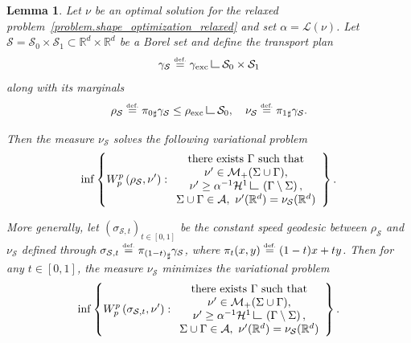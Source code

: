 \documentclass[10pt]{amsart}
\newtheorem{lemma}[theorem]{Lemma}
\theoremstyle{definition}
\newcommand{\eqdef}{\ensuremath{\stackrel{\mbox{\upshape\tiny def.}}{=}}}
\newcommand\LM[1]{\hbox{\vrule width.5pt \vbox to#1pt{\vfill \hrule width#1pt height.5pt}}}
\newcommand\LL{{\mathchoice {\>\LM7\>}{\>\LM7\>}{\,\LM5\,}{\,\LM{3.35}\,}}}
\newcommand{\mres}{\LL}
\newcommand{\RR}{\mathbb{R}}
\newcommand{\rhoexc}{\rho_{\textup{exc}}}
\newcommand{\gammaexc}{\gamma_{\textup{exc}}}
\begin{document}
\begin{lemma}\label{lemma.auxiliary_problem}
Let $\nu$ be an optimal solution for the relaxed problem~\eqref{problem.shape_optimization_relaxed} and set $\alpha = \mathcal{L}(\nu)$. Let $\mathcal{S} = \mathcal{S}_0\times \mathcal{S}_1 \subset \RR^d\times \RR^d$ be a Borel set and define the transport plan
\[
\gamma_{\mathcal{S}} \eqdef \gammaexc \mres \mathcal{S}_0\times \mathcal{S}_1
\]
along with its marginals
\[
\rho_{\mathcal{S}} \eqdef {\pi_{0}}_\sharp\gamma_\mathcal{S}
\le \rhoexc \mres \mathcal{S}_0,
\quad \nu_{\mathcal{S}} \eqdef {\pi_{1}}_\sharp\gamma_{\mathcal{S}}.
\]

Then the measure $\nu_{\mathcal{S}}$ solves the following variational problem
\begin{equation}
\inf
\left\{
W_p^p\left(
\rho_{\mathcal{S}}, \nu'
\right) :
\begin{array}{c}
\text{there exists $\Gamma$ such that}\\
\nu' \in \mathcal{M}_+(\Sigma \cup \Gamma),\\
\nu' \ge \alpha^{-1}\mathcal{H}^1\mres \left(\Gamma\setminus \Sigma\right), \\
\Sigma \cup \Gamma \in \mathcal{A}, \
\nu'(\RR^d) = \nu_{\mathcal{S}}(\RR^d)
\end{array}
\right\}.
\end{equation}

More generally, let $\left(\sigma_{\mathcal{S},t}\right)_{t \in [0,1]}$ be the constant speed geodesic between $\rho_{\mathcal{S}}$ and $\nu_{\mathcal{S}}$ defined through $\sigma_{\mathcal{S},t} \eqdef {\pi_{(1-t)}}_\sharp\gamma_{\mathcal{S}}$, where $\pi_t(x,y) \eqdef (1-t)x + ty$. Then for any $t \in [0,1]$, the measure $\nu_{\mathcal{S}}$ minimizes the variational problem
\begin{equation}\label{auxiliary_problem_sigma}
\inf
\left\{
W_p^p\left(
\sigma_{\mathcal{S}, t}, \nu'
\right) :
\begin{array}{c}
\text{there exists $\Gamma$ such that}\\
\nu' \in \mathcal{M}_+(\Sigma \cup \Gamma),\\
\nu' \ge \alpha^{-1}\mathcal{H}^1\mres \left(\Gamma\setminus \Sigma\right), \\
\Sigma \cup \Gamma \in \mathcal{A}, \
\nu'(\RR^d) = \nu_{\mathcal{S}}(\RR^d)
\end{array}
\right\}.
\end{equation}
\end{lemma}
\end{document}
